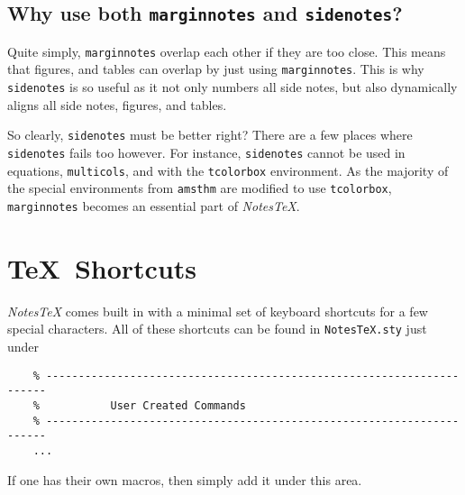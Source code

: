 \documentclass[10pt]{article}
\begin{document}
	\subsection{Why use both \texttt{marginnotes} and \texttt{sidenotes}?}
	Quite simply, \texttt{marginnotes} overlap each other if they are too close. This means that figures, and tables can overlap by just using \texttt{marginnotes}. This is why \texttt{sidenotes} is so useful as it not only numbers all side notes, but also dynamically aligns all side notes, figures, and tables.

	So clearly, \texttt{sidenotes} must be better right? There are a few places where \texttt{sidenotes} fails too however. For instance, \texttt{sidenotes} cannot be used in equations, \texttt{multicols}, and with the \texttt{tcolorbox} environment. As the majority of the special environments from \texttt{amsthm} are modified to use \texttt{tcolorbox}, \texttt{marginnotes} becomes an essential part of \textit{NotesTeX}.

	\newpage

	\section{\TeX\ Shortcuts}\label{sec:shortcuts}
	\textit{NotesTeX} comes built in with a minimal set of keyboard shortcuts for a few special characters. All of these shortcuts can be found in \texttt{NotesTeX.sty} just under
	\begin{verbatim}
	% ----------------------------------------------------------------------
	%           User Created Commands
	% ----------------------------------------------------------------------
	...
	\end{verbatim}
	If one has their own macros, then simply add it under this area. 
\end{document}
